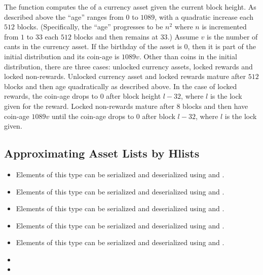 The function {} computes the {} of a
currency asset given the current block height.
As described above the ``age'' ranges from $0$ to $1089$,
with a quadratic increase each $512$ blocks.
(Specifically, the ``age'' progresses to be $n^2$
where $n$ is incremented from $1$ to $33$ each $512$ blocks
and then remains at $33$.)
Assume $v$ is the number of cants in the currency asset.
If the birthday of the asset is $0$, then it is part of the initial distribution
and its coin-age is $1089 v$.
Other than coins in the initial distribution,
there are three cases: unlocked currency assets, locked rewards and locked non-rewards.
Unlocked currency asset and locked rewards mature after $512$ blocks and then age quadratically
as described above. In the case of locked rewards, the coin-age drops to $0$
after block height $l-32$, where $l$ is the lock given for the reward.
Locked non-rewards mature after $8$ blocks and then have coin-age $1089 v$
until the coin-age drops to $0$ after block $l-32$, where $l$ is the lock given.

\subsection{Approximating Asset Lists by Hlists}

\begin{itemize}
\item {}
Elements of this type can be serialized and deserialized using
{}
and {}.
\item {}
Elements of this type can be serialized and deserialized using
{}
and
{}.
\item {}
Elements of this type can be serialized and deserialized using
{}
and
{}.
\item {}
Elements of this type can be serialized and deserialized using
{}
and
{}.
\item {}
Elements of this type can be serialized and deserialized using
{}
and
{}.
\end{itemize}

\begin{itemize}
\item {}
\item {}
\end{itemize}

